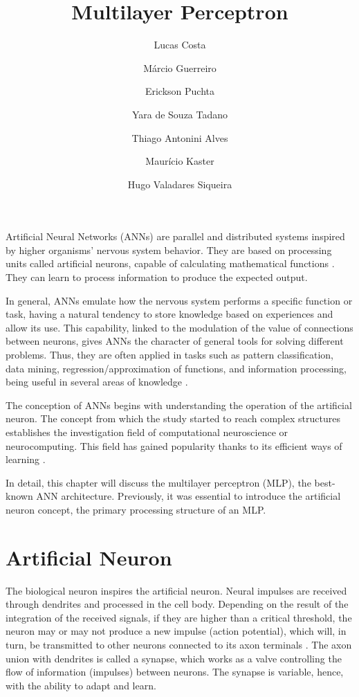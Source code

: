 \title{Multilayer Perceptron}
\label{chp:multilayer-perceptron}
\author{Lucas Costa \and Márcio Guerreiro \and Erickson Puchta \and Yara de Souza Tadano \and Thiago Antonini Alves \and  Maurício Kaster \and Hugo Valadares Siqueira}
\institute{}
\maketitle

Artificial Neural Networks (ANNs) are parallel and distributed systems inspired by higher organisms' nervous system %
behavior. They are based on processing units called artificial neurons, capable of calculating mathematical functions \cite{haykin}. They can learn to process information to produce the expected output\cite{Castro2006FundamentalsON}.

In general, ANNs emulate how the nervous system performs a specific function or task, having a natural %
tendency to store knowledge based on experiences and allow its use. This capability, linked to the modulation of the value of connections between neurons, gives ANNs the character of general tools for solving different problems. Thus, they are often applied in tasks such as pattern classification, data mining, regression/approximation of functions, and information processing, being useful in several areas of knowledge \cite{haykin}.

The conception of ANNs begins with understanding the %
operation of the artificial neuron. The concept from which the study started to reach complex structures %
establishes the investigation field of computational neuroscience or neurocomputing. This field has gained popularity thanks to its efficient ways of learning \cite{Russell2009}.

In detail, this chapter will discuss the multilayer perceptron (MLP), the best-known ANN architecture. %
Previously, it was essential to introduce the artificial neuron concept, 
the primary processing structure of an MLP.


\section{Artificial Neuron}
\label{sec:neuronio}

The biological neuron inspires the artificial neuron. Neural impulses are received through dendrites and processed in the cell body. Depending on the result of the integration of the received signals, if they are %
higher than
a critical threshold, the neuron may or may not produce a new impulse (action potential), which will, in turn, be transmitted to other neurons connected to its axon terminals \cite{Castro2006FundamentalsON}. The axon union with dendrites is called a synapse, which works as a valve controlling the flow of information (impulses) between neurons. The synapse is variable, hence,
with
the ability to adapt and learn.

